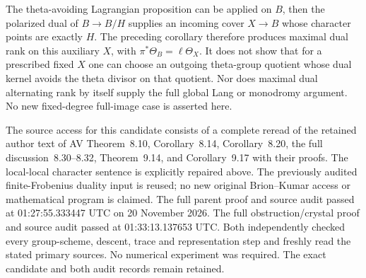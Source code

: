 \begin{remark}
\label{rem:principal-theta-Cartier-bridge-scope}
The theta-avoiding Lagrangian proposition can be applied on \(B\),
then the polarized dual of \(B\to B/H\) supplies an incoming cover
\(X\to B\) whose character points are exactly \(H\).  The preceding
corollary therefore produces maximal dual rank on this auxiliary
\(X\), with \(\pi^*\Theta_B=\ell\Theta_X\).  It does not show that
for a prescribed fixed \(X\) one can choose an outgoing theta-group
quotient whose dual kernel avoids the theta divisor on that quotient.
Nor does maximal dual alternating rank by itself supply the full
global Lang or monodromy argument.  No new fixed-degree full-image
case is asserted here.

The source access for this candidate consists of a complete reread of
the retained author text of AV Theorem~8.10, Corollary~8.14,
Corollary~8.20, the full discussion~8.30--8.32, Theorem~9.14, and
Corollary~9.17 with their proofs.  The local-local character sentence
is explicitly repaired above.  The previously audited finite-Frobenius
duality input is reused; no new original Brion--Kumar access or
mathematical program is claimed.  The full parent proof and source audit passed at 01:27:55.333447 UTC
on 20 November 2026.  The full obstruction/crystal proof and source
audit passed at 01:33:13.137653 UTC.  Both independently checked every
group-scheme, descent, trace and representation step and freshly read
the stated primary sources.  No numerical experiment was required.
The exact candidate and both audit records remain retained.
\end{remark}
